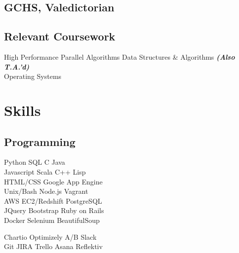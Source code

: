 \documentclass[]{deedy-resume-openfont}
\begin{document}
\begin{minipage}[t]{0.31\textwidth}
\subsection{GCHS, Valedictorian}
\sectionsep

\subsection{Relevant Coursework}
High Performance Parallel Algorithms
Data Structures \& Algorithms
{\footnotesize \textit{\textbf{(Also T.A.'d) }}} \\
Operating Systems
\\[1\baselineskip]


\section{Skills}
\subsection{Programming}

Python \textbullet{}  SQL  \textbullet{} C \textbullet{} Java 
\\[1\baselineskip]

Javascript \textbullet{} Scala \textbullet{}  C++  \textbullet{} Lisp
\\[1\baselineskip]

HTML/CSS \textbullet{} Google App Engine \\
\textbullet{}  Unix/Bash \textbullet{} Node.js \textbullet{}  Vagrant \\
\textbullet{} AWS EC2/Redshift \textbullet{} PostgreSQL 
\\[1\baselineskip]

JQuery \textbullet{} Bootstrap \textbullet{}  Ruby on Rails \\
\textbullet{} Docker \textbullet{} Selenium \textbullet{}  BeautifulSoup
\sectionsep

Chartio \textbullet{}  Optimizely A/B \textbullet{}  Slack \\
\textbullet{}  Git \textbullet{}  JIRA \textbullet{} Trello \textbullet{} Asana \textbullet{} Reflektiv
\sectionsep


\end{minipage}
\end{document}
